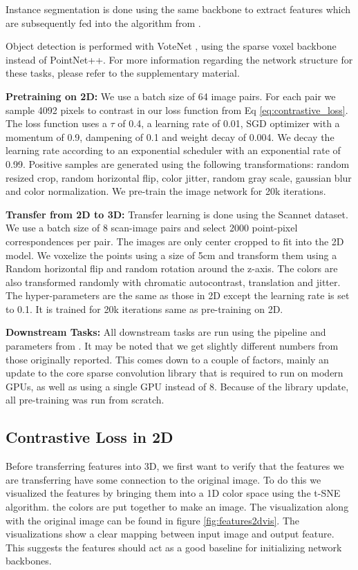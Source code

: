 \documentclass[10pt,twocolumn,letterpaper]{article}
\begin{document}
Instance segmentation is done using the same backbone to extract features which are subsequently fed into the algorithm from \cite{jiang2020pointgroup}.

Object detection is performed with VoteNet \cite{qi2019deep}, using the sparse voxel backbone instead of PointNet++. For more information regarding the network structure for these tasks, please refer to the supplementary material.

\textbf{Pretraining on 2D:} We use a batch size of 64 image pairs. For each pair we sample 4092 pixels to contrast in our loss function from Eq \ref{eq:contrastive_loss}. The loss function uses a $\tau$ of 0.4, a learning rate of 0.01, SGD optimizer with a momentum of 0.9, dampening of 0.1 and weight decay of 0.004. We decay the learning rate according to an exponential scheduler with an exponential rate of 0.99. Positive samples are generated using the following transformations: random resized crop, random horizontal flip, color jitter, random gray scale, gaussian blur and color normalization. We pre-train the image network for 20k iterations.

\textbf{Transfer from 2D to 3D:} Transfer learning is done using the Scannet dataset. We use a batch size of 8 scan-image pairs and select 2000 point-pixel correspondences per pair. The images are only center cropped to fit into the 2D model. We voxelize the points using a size of 5cm and transform them using a Random horizontal flip and random rotation around the z-axis. The colors are also transformed randomly with chromatic autocontrast, translation and jitter. The hyper-parameters are the same as those in 2D except the learning rate is set to 0.1. It is trained for 20k iterations same as pre-training on 2D.

\textbf{Downstream Tasks:} All downstream tasks are run using the pipeline and parameters from \cite{hou2021Exploring}. It may be noted that we get slightly different numbers from those originally reported. This comes down to a couple of factors, mainly an update to the core sparse convolution library that is required to run on modern GPUs, as well as using a single GPU instead of 8. Because of the library update, all pre-training was run from scratch.

\subsection{Contrastive Loss in 2D}
\label{sec:results:2d}

Before transferring features into 3D, we first want to verify that the features we are transferring have some connection to the original image. To do this we visualized the features by bringing them into a 1D color space using the t-SNE \cite{maaten2008Visualizing} algorithm. the colors are put together to make an image. The visualization along with the original image can be found in figure \ref{fig:features2dvis}. The visualizations show a clear mapping between input image and output feature. This suggests the features should act as a good baseline for initializing network backbones.
\end{document}

